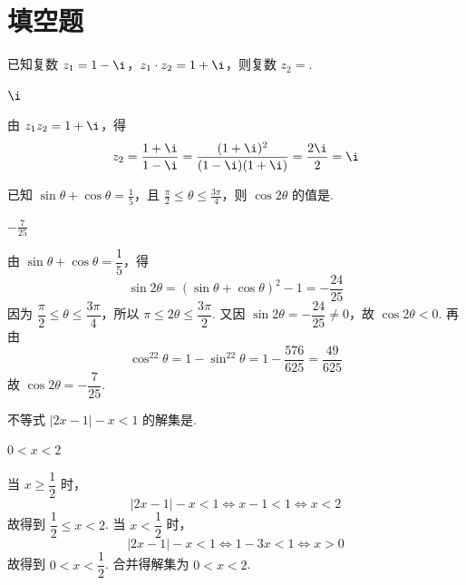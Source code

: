 \section{填空题}

\begin{problem}
已知复数 \(z_{1} = 1 - \i\)，\(z_{1} \cdot z_{2} = 1 + \i\)，则复数 \( z_{2} = \)\fillinblank{}.
\begin{answer}
\(\i\)
\end{answer}

\begin{solution}
由 \(z_1z_2=1+\i\)，得
\[
z_2=\frac{1+\i}{1-\i}=\frac{(1+\i)^2}{(1-\i)(1+\i)}=\frac{2\i}{2}=\i
\]
\end{solution}
\end{problem}

\begin{problem}
已知 \(\sin \theta + \cos \theta = \frac{1}{5}\)，且 \(\frac{\pi}{2} \leqslant \theta \leqslant \frac{3\pi}{4}\)，则 \(\cos 2\theta\) 的值是\fillinblank{}.
\begin{answer}
\(-\frac{7}{25}\)
\end{answer}

\begin{solution}
由 \(\sin\theta+\cos\theta=\dfrac15\)，得
\[
\sin2\theta=\left(\sin\theta+\cos\theta\right)^2-1=-\frac{24}{25}
\]
因为 \(\dfrac\pi2\leqslant\theta\leqslant\dfrac{3\pi}{4}\)，所以 \(\pi\leqslant2\theta\leqslant\dfrac{3\pi}{2}\). 又因 \(\sin2\theta=-\dfrac{24}{25}\ne0\)，故 \(\cos2\theta<0\). 再由
\[
\cos^22\theta=1-\sin^22\theta=1-\frac{576}{625}=\frac{49}{625}
\]
故 \(\cos2\theta=-\dfrac7{25}\).
\end{solution}
\end{problem}

\begin{problem}
不等式 \(\left|2x - 1\right| - x < 1\) 的解集是\fillinblank{}.
\begin{answer}
\(0 < x < 2\)
\end{answer}

\begin{solution}
当 \(x\geqslant\dfrac12\) 时，
\[
\lvert2x-1\rvert-x<1\Longleftrightarrow x-1<1\Longleftrightarrow x<2
\]
故得到 \(\dfrac12\leqslant x<2\). 当 \(x<\dfrac12\) 时，
\[
\lvert2x-1\rvert-x<1\Longleftrightarrow1-3x<1\Longleftrightarrow x>0
\]
故得到 \(0<x<\dfrac12\). 合并得解集为 \(0<x<2\).
\end{solution}
\end{problem}

